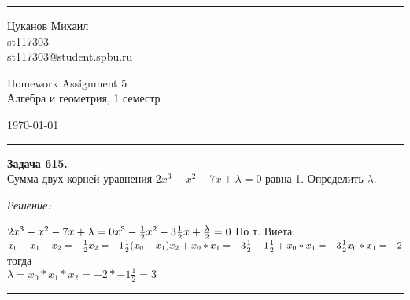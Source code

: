 \documentclass[a4paper, 12pt]{article}
\newenvironment{problem}[2][Задача]
    { \begin{mdframed}[backgroundcolor=gray!10] \textbf{#1 #2.} \\}
    {  \end{mdframed}}
\newenvironment{solution}
    {\textit{Решение: }}
    {\noindent\rule{7in}{1.5pt}}
\begin{document}

\fancyhead[C]{}
\hrule \medskip %
\begin{minipage}{0.295\textwidth}
\raggedright\footnotesize
Цуканов Михаил \hfill\\
st117303 \hfill\\
st117303@student.spbu.ru
\end{minipage}
\begin{minipage}{0.4\textwidth}
\centering\large
Homework Assignment 5\\
\normalsize
Алгебра и геометрия, 1 семестр\\
\end{minipage}
\begin{minipage}{0.295\textwidth}
\raggedleft
\today\hfill\\
\end{minipage}
\medskip\hrule
\bigskip




\begin{problem}{615}
Сумма двух корней уравнения $2x^3-x^2-7x+\lambda=0$ равна 1. Определить $\lambda$.
\end{problem}
\begin{solution}

$
2x^3-x^2-7x+\lambda=0 \\
x^3-\frac{1}{2}x^2-3\frac{1}{2}x+\frac{\lambda}{2}=0 \\
\\
$
По т. Виета: \\
$
x_0 + x_1 + x_2 = -\frac{1}{2} \\
x_2 = -1\frac{1}{2} \\
\\
(x_0 + x_1)x_2 + x_0*x_1 = -3\frac{1}{2} \\
-1\frac{1}{2} + x_0*x_1 = -3\frac{1}{2} \\
x_0*x_1 = -2 \\
\\
$
тогда \\
$
\lambda = x_0*x_1*x_2 = -2 * -1\frac{1}{2} = 3
$

\end{solution}
\end{document}
